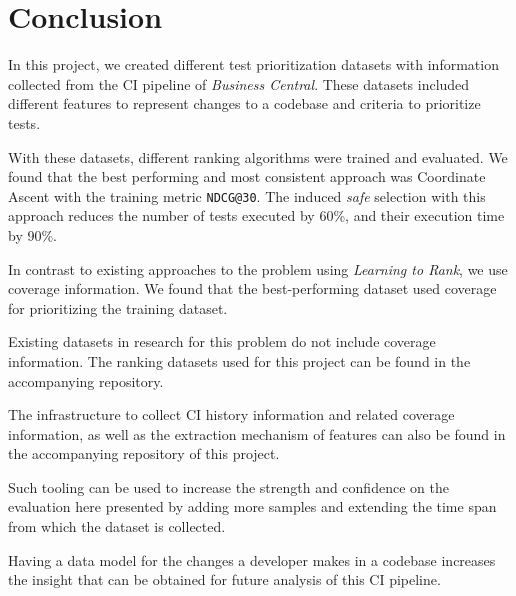 \chapter{Conclusion}

In this project, we created different test prioritization datasets with 
information collected from the CI pipeline of \emph{Business Central}. These datasets included
different features to represent changes to a codebase and criteria to prioritize tests.

With these datasets, different ranking algorithms were trained and evaluated. We
found that the best performing and most consistent approach was Coordinate Ascent
with the training metric \texttt{NDCG@30}. The induced \emph{safe} selection with
this approach reduces the number of tests executed by 60\%, and their execution time 
by 90\%.

In contrast to existing approaches to the problem using \emph{Learning to Rank},
we use coverage information. We found that the best-performing dataset
used coverage for prioritizing the training dataset. 

Existing datasets in research for this problem do not include 
coverage information. The ranking datasets used for this project 
can be found in the accompanying repository. 

The infrastructure to collect CI history information and related coverage information,
as well as the extraction mechanism of features can also be found in the accompanying 
repository of this project.

Such tooling can be used to increase the strength and confidence on the 
evaluation here presented by adding more samples and extending 
the time span from which the dataset is collected. 

Having a data model for the changes a developer makes in a codebase increases
the insight that can be obtained for future analysis of this CI pipeline.

%